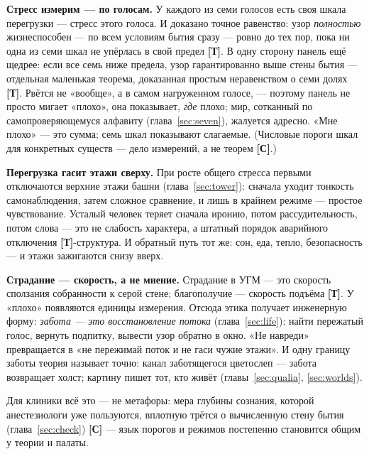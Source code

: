 \documentclass[11pt,letterpaper]{article}
\newcommand{\stT}{\textbf{[Т]}\xspace}
\newcommand{\stC}{\textbf{[С]}\xspace}
\begin{document}
\textbf{Стресс измерим --- по голосам.} У каждого из семи голосов
есть своя шкала перегрузки --- стресс этого голоса. И доказано
точное равенство: узор \emph{полностью} жизнеспособен --- по всем
условиям бытия сразу --- ровно до тех пор, пока ни одна из семи
шкал не упёрлась в свой предел \stT. В одну сторону панель ещё
щедрее: если все семь ниже предела, узор гарантированно выше стены
бытия --- отдельная маленькая теорема, доказанная простым
неравенством о семи долях \stT. Рвётся не «вообще»,
а в самом нагруженном голосе, --- поэтому панель не просто мигает
«плохо», она показывает, \emph{где} плохо; мир, сотканный по
самопроверяющемуся алфавиту (глава~\ref{sec:seven}), жалуется
адресно. «Мне плохо» --- это сумма; семь шкал показывают слагаемые.
(Числовые пороги шкал для конкретных существ --- дело измерений,
а не теорем \stC.)

\textbf{Перегрузка гасит этажи сверху.} При росте общего стресса
первыми отключаются верхние этажи башни (глава~\ref{sec:tower}):
сначала уходит тонкость самонаблюдения, затем сложное сравнение,
и лишь в крайнем режиме --- простое чувствование. Усталый человек
теряет сначала иронию, потом рассудительность, потом слова --- это
не слабость характера, а штатный порядок аварийного отключения
\stT-структура. И обратный путь тот же: сон, еда, тепло, безопасность
--- и этажи зажигаются снизу вверх.

\textbf{Страдание --- скорость, а не мнение.} Страдание в УГМ --- это
скорость сползания собранности к серой стене; благополучие ---
скорость подъёма \stT. У «плохо» появляются единицы измерения. Отсюда
этика получает инженерную форму: \emph{забота --- это восстановление
потока} (глава~\ref{sec:life}): найти пережатый голос, вернуть
подпитку, вывести узор обратно в окно. «Не навреди» превращается в
«не пережимай поток и не гаси чужие этажи». И одну границу заботы
теория называет точно: канал заботящегося цветослеп --- забота
возвращает холст; картину пишет тот, кто живёт
(главы~\ref{sec:qualia}, \ref{sec:worlds}).

Для клиники всё это --- не метафоры: мера глубины сознания, которой
анестезиологи уже пользуются, вплотную трётся о вычисленную стену
бытия (глава~\ref{sec:check}) \stC{} --- язык порогов и режимов
постепенно становится общим у теории и палаты.
\end{document}
